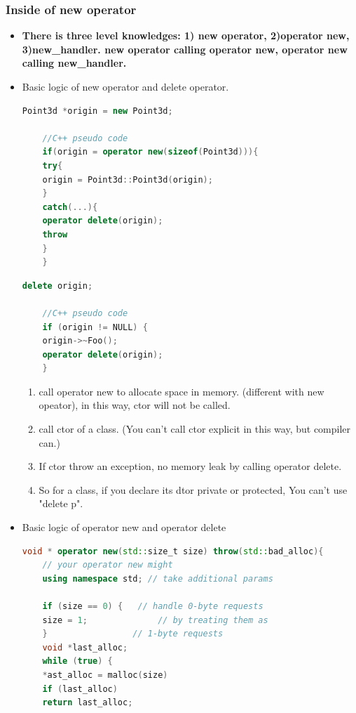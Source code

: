 \documentclass[a4paper,12pt,twoside]{book}
\begin{document}
\subsubsection{Inside of new operator}
\begin{itemize}
	\item \textbf{There is three level knowledges: 1) new operator, 2)operator new, 3)new\_handler. new operator calling operator new, operator new calling new\_handler.} 
	
	\item Basic logic of new operator and delete operator.
	\begin{lstlisting}[frame=single, language=c++]
	Point3d *origin = new Point3d;
	
	//C++ pseudo code
	if(origin = operator new(sizeof(Point3d))){
	try{
	origin = Point3d::Point3d(origin);
	}
	catch(...){
	operator delete(origin);
	throw
	}
	}
	\end{lstlisting}
	
	\begin{lstlisting}[frame=single, language=c++]
	delete origin;
	
	//C++ pseudo code
	if (origin != NULL) {
	origin->~Foo();
	operator delete(origin);
	}
	\end{lstlisting}
	
	\begin{enumerate}
		\item call operator new to allocate space in memory. (different with new opeator), in this way, ctor will not be called.
		\item call ctor of a class. (You can't call ctor explicit in this way, but compiler can.)
		\item If ctor throw an exception, no memory leak by calling operator delete.
		
		\item So for a class, if you declare its dtor private or protected, You can't use "delete p".
	\end{enumerate}
	
	
	\item Basic logic of operator new and operator delete
	\begin{lstlisting}[frame=single, language=c++]
	void * operator new(std::size_t size) throw(std::bad_alloc){                      
	// your operator new might
	using namespace std; // take additional params
	
	if (size == 0) {   // handle 0-byte requests
	size = 1;              // by treating them as
	}                 // 1-byte requests
	void *last_alloc;
	while (true) {
	*ast_alloc = malloc(size)
	if (last_alloc)
	return last_alloc;
	

\end{lstlisting}
\end{itemize}
\end{document}
